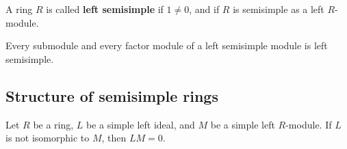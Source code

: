 \begin{definition}
    A ring $R$ is called \textbf{left semisimple} if $1\neq 0$, and if $R$ is semisimple as a left $R$-module.
\end{definition}

\begin{proposition}
    Every submodule and every factor module of a left semisimple module is left semisimple.
\end{proposition}


\subsection{Structure of semisimple rings} %
\begin{lemma}
    \label{lem: Lemma of structure theorem for semisimple rings}
    Let $R$ be a ring, $L$ be a simple left ideal, and $M$ be a simple left $R$-module. If $L$ is not isomorphic to $M$, then $L M=0$.
\end{lemma}


